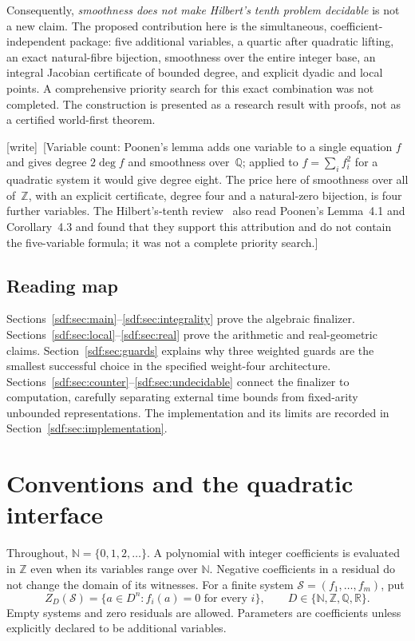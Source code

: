 \documentclass[11pt,a4paper]{article}
\theoremstyle{definition}
\theoremstyle{remark}
\newcommand{\N}{\mathbb N}
\newcommand{\Z}{\mathbb Z}
\newcommand{\Q}{\mathbb Q}
\newcommand{\R}{\mathbb R}
\newcommand{\zeros}[2]{Z_{#1}(#2)}
\newcommand{\source}{\mathcal S}
\newcommand{\wtag}{\textup{[write]}}
\begin{document}
Consequently, \emph{smoothness does not make Hilbert's tenth problem decidable}
is not a new claim. The proposed contribution here is the simultaneous,
coefficient-independent package: five additional variables, a quartic after
quadratic lifting, an exact natural-fibre bijection, smoothness over the entire
integer base, an integral Jacobian certificate of bounded degree, and explicit
dyadic and local points. A comprehensive priority search for this exact
combination was not completed. The construction is presented as a research
result with proofs, not as a certified world-first theorem.

\wtag\ [Variable count: Poonen's lemma adds one variable to a single
equation $f$ and gives degree $2\deg f$ and smoothness over~$\Q$; applied to
$f=\sum_if_i^2$ for a quadratic system it would give degree eight. The price
here of smoothness over all of~$\Z$, with an explicit certificate, degree
four and a natural-zero bijection, is four further variables. The
Hilbert's-tenth review~\cite{review13} also read Poonen's Lemma~4.1 and
Corollary~4.3 and found that they support this attribution and do not
contain the five-variable formula; it was not a complete priority search.]

\subsection{Reading map}

Sections~\ref{sdf:sec:main}--\ref{sdf:sec:integrality} prove the algebraic finalizer.
Sections~\ref{sdf:sec:local}--\ref{sdf:sec:real} prove the arithmetic and real-geometric
claims. Section~\ref{sdf:sec:guards} explains why three weighted guards are the
smallest successful choice in the specified weight-four architecture.
Sections~\ref{sdf:sec:counter}--\ref{sdf:sec:undecidable} connect the finalizer to
computation, carefully separating external time bounds from fixed-arity
unbounded representations. The implementation and its limits are recorded
in Section~\ref{sdf:sec:implementation}.

\section{Conventions and the quadratic interface}\label{sdf:sec:interface}

Throughout, $\N=\{0,1,2,\ldots\}$. A polynomial with integer coefficients is
evaluated in $\Z$ even when its variables range over $\N$. Negative
coefficients in a residual do not change the domain of its witnesses.
For a finite system $\source=(f_1,\ldots,f_m)$, put
\[
 \zeros{D}{\source}=
 \{a\in D^n:f_i(a)=0\text{ for every }i\},
 \qquad D\in\{\N,\Z,\Q,\R\}.
\]
Empty systems and zero residuals are allowed. Parameters are coefficients
unless explicitly declared to be additional variables.
\end{document}
